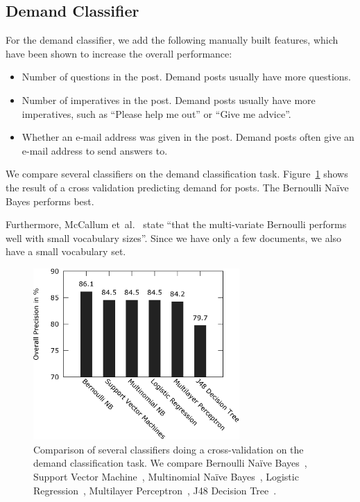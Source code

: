 \subsection{Demand Classifier}
For the demand classifier, we add the following manually built features, which have been shown to increase the overall performance:
\begin{itemize}
	\item Number of questions in the post. Demand posts usually have more questions.
	\item Number of imperatives in the post. Demand posts usually have more imperatives, such as ``Please help me out'' or ``Give me advice''.
	\item Whether an e-mail address was given in the post. Demand posts often give an e-mail address to send answers to.
\end{itemize}

We compare several classifiers on the demand classification task.
Figure~\ref{fig:compare-demand} shows the result of a cross validation predicting demand for posts.
The Bernoulli Na\"{i}ve Bayes performs best.

Furthermore, McCallum et~al.~\cite{mccallum1998comparison} state ``that the multi-variate Bernoulli performs well with small vocabulary sizes''.
Since we have only a few documents, we also have a small vocabulary set.

\begin{figure}
	\begin{center}
		\includegraphics[width=0.7\textwidth]{figures/compare_demand_classifiers.eps}
	\end{center}
	\caption{Comparison of several classifiers doing a cross-validation on the demand classification task.
		We compare Bernoulli Na\"{i}ve Bayes~\cite{John1995}, Support Vector Machine~\cite{Platt1998}, Multinomial Na\"{i}ve Bayes~\cite{kibriya2005multinomial}, Logistic Regression~\cite{leCessie1992}, Multilayer Perceptron~\cite{ruck1990multilayer}, J48 Decision Tree~\cite{Quinlan1993}.
	}
	\label{fig:compare-demand}
\end{figure}

